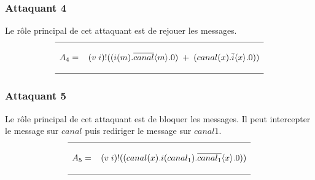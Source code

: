 \documentclass[10pt,a4paper]{article}
\begin{document}
\subsubsection{Attaquant 4}
Le rôle principal de cet attaquant est de rejouer les messages.
\[ 
\begin{array}{l}
\hline
\\
A_{4}= \;\;\; (v\;i)!((i(m).\overline{canal}\langle m \rangle.0)\;+\;(canal(x).\overline{i}\langle x\rangle.0))\\ 
\\
\hline
\end{array}       
\]

\subsubsection{Attaquant 5}
Le rôle principal de cet attaquant est de bloquer les messages. Il peut intercepter le message sur $canal$ puis rediriger le message sur $canal1$.
\[ 
\begin{array}{l}
\hline
\\
A_{5}= \;\;\; (v\;i)!((canal(x).i(canal_{1}).\overline{canal_{1}}\langle x\rangle.0))\\ 
\\
\hline
\end{array}       
\]
\newpage
\end{document}
